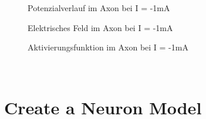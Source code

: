 \documentclass[conference]{IEEEtran}
\begin{document}
\begin{enumerate}
\begin{figure}[h!]
  	\centering
    \scalebox{.6}{}
    \vspace{-10pt}
    \caption{Potenzialverlauf im Axon bei I = -1mA}
    \vspace{-10pt}
    \label{fig:Phi2}
\end{figure}
\begin{figure}[h!]
  	\centering
    \scalebox{.6}{}
    \vspace{-10pt}
    \caption{Elektrisches Feld im Axon bei I = -1mA}
    \vspace{-10pt}
    \label{fig:E2}
\end{figure}
\begin{figure}[h!]
  	\centering
    \scalebox{.6}{}
    \vspace{-10pt}
    \caption{Aktivierungsfunktion im Axon bei I = -1mA}
    \vspace{-10pt}
    \label{fig:A2}
\end{figure}

\end{enumerate}

\pagebreak
~
\newpage
\vspace{30pt}
\section{Create a Neuron Model}
\end{document}
